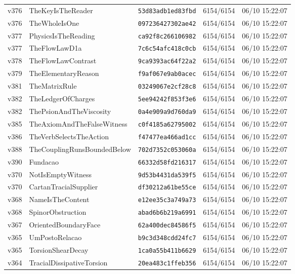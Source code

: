 \documentclass[11pt]{article}
\theoremstyle{definition}\newtheorem{deriv}{Derivation}
\begin{document}
{\begin{longtable}{@{}lllll@{}}
v376 & TheKeyIsTheReader & \texttt{53d83adb1ed83fbd} & 6154/6154 & 06/10 15:22:07 \\
v376 & TheWholeIsOne & \texttt{097236427302ae42} & 6154/6154 & 06/10 15:22:07 \\
v377 & PhysicsIsTheReading & \texttt{ca92f8c266106982} & 6154/6154 & 06/10 15:22:07 \\
v377 & TheFlowLawD1a & \texttt{7c6c54afc418c0cb} & 6154/6154 & 06/10 15:22:07 \\
v378 & TheFlowLawContrast & \texttt{9ca9393ac64f22a2} & 6154/6154 & 06/10 15:22:07 \\
v379 & TheElementaryReason & \texttt{f9af067e9ab0acec} & 6154/6154 & 06/10 15:22:07 \\
v381 & TheMatrixRule & \texttt{03249067e2cf28c8} & 6154/6154 & 06/10 15:22:07 \\
v382 & TheLedgerOfCharges & \texttt{5ee94242f853f3e6} & 6154/6154 & 06/10 15:22:07 \\
v382 & ThePsionAndTheViscosity & \texttt{0a4e909a9d760da9} & 6154/6154 & 06/10 15:22:07 \\
v385 & TheAxiomAndTheFalseWitness & \texttt{c0f4185a62795002} & 6154/6154 & 06/10 15:22:07 \\
v386 & TheVerbSelectsTheAction & \texttt{f47477ea466ad1cc} & 6154/6154 & 06/10 15:22:07 \\
v388 & TheCouplingRunsBoundedBelow & \texttt{702d7352c053060a} & 6154/6154 & 06/10 15:22:07 \\
v390 & Fundacao & \texttt{66332d58fd216317} & 6154/6154 & 06/10 15:22:07 \\
v370 & NotIsEmptyWitness & \texttt{9d53b4431da539f5} & 6154/6154 & 06/10 15:22:07 \\
v370 & CartanTracialSupplier & \texttt{df30212a61be55ce} & 6154/6154 & 06/10 15:22:07 \\
v368 & NameIsTheContent & \texttt{e12ee35c3a749a73} & 6154/6154 & 06/10 15:22:07 \\
v368 & SpinorObstruction & \texttt{abad6b6b219a6991} & 6154/6154 & 06/10 15:22:07 \\
v367 & OrientedBoundaryFace & \texttt{62a400dec84586f5} & 6154/6154 & 06/10 15:22:07 \\
v365 & UmPostoRelacao & \texttt{b9c3d348cdd24fc7} & 6154/6154 & 06/10 15:22:07 \\
v365 & TorsionShearDecay & \texttt{1ca0a55b411b6629} & 6154/6154 & 06/10 15:22:07 \\
v364 & TracialDissipativeTorsion & \texttt{20ea483c1ffeb356} & 6154/6154 & 06/10 15:22:07 \\

\end{longtable}}
\end{document}
